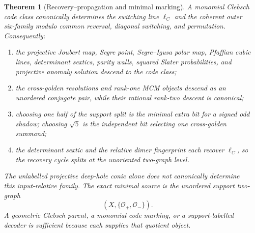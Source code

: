 \documentclass[11pt]{article}
\newtheorem{theorem}{Theorem}[section]
\theoremstyle{definition}
\theoremstyle{remark}
\begin{document}
\begin{theorem}[Recovery--propagation and minimal marking]
\label{thm:recovery-propagation}
A monomial Clebsch code class canonically determines the switching line
\(\ell_C\) and the coherent outer six-family modulo common reversal,
diagonal switching, and permutation.  Consequently:
\begin{enumerate}[label=\textup{(\alph*)},leftmargin=*]
\item the projective Joubert map, Segre point, Segre--Igusa polar map,
  Pfaffian cubic lines, determinant sextics, parity walls, squared Slater
  probabilities, and projective anomaly solution descend to the code
  class;
\item the cross-golden resolutions and rank-one MCM objects descend as an
  unordered conjugate pair, while their rational rank-two descent is
  canonical;
\item choosing one half of the support split is the minimal extra bit for
  a signed odd shadow; choosing \(\sqrt5\) is the independent bit selecting
  one cross-golden summand;
\item the determinant sextic and the relative dimer fingerprint each
  recover \(\ell_C\), so the recovery cycle splits at the unoriented
  two-graph level.
\end{enumerate}
The unlabelled projective deep-hole conic alone does not canonically
determine this input-relative family.  The exact minimal source is the
unordered support two-graph
\[
 (X,\{\mathcal O_+,\mathcal O_-\}).
\]
A geometric Clebsch parent, a monomial code marking, or a support-labelled
decoder is sufficient because each supplies that quotient object.
\end{theorem}
\end{document}
